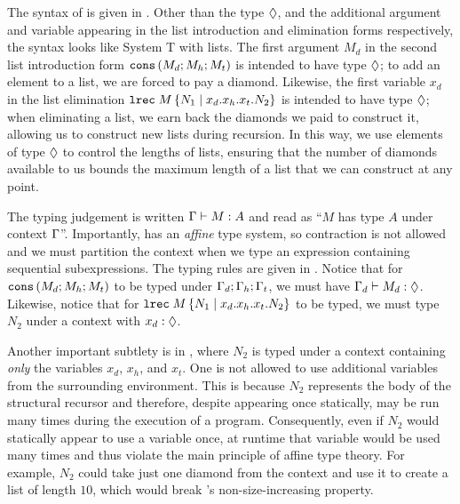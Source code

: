 

The syntax of \lfpl is given in . Other than the type $\tpdiam$, and the additional argument and variable appearing in the list introduction and elimination forms respectively, the syntax looks like System T with lists. The first argument $M_d$ in the second list introduction form $\tmcons{M_d}{M_h}{M_t}$ is intended to have type $\tpdiam$; to add an element to a list, we are forced to pay a diamond. Likewise, the first variable $x_d$ in the list elimination $\tmrec{M}{N_1}{x_d}{x_h}{x_t}{N_2}$ is intended to have type $\tpdiam$; when eliminating a list, we earn back the diamonds we paid to construct it, allowing us to construct new lists during recursion. In this way, we use elements of type $\tpdiam$ to control the lengths of lists, ensuring that the number of diamonds available to us bounds the maximum length of a list that we can construct at any point.

\enlargethispage{-1\baselineskip}
The typing judgement is written $\Gamma \vdash M : A$ and read as ``$M$ has type $A$ under context $\Gamma$''. Importantly, \lfpl has an \textit{affine} type system, so contraction is not allowed and we must partition the context when we type an expression containing sequential subexpressions. The typing rules are given in . Notice that for $\tmcons{M_d}{M_h}{M_t}$ to be typed under $\Gamma_d ; \Gamma_h ; \Gamma_t$, we must have $\types{\ctx_d}{M_d}{\tpdiam}$. Likewise, notice that for $\tmrec{M}{N_1}{x_d}{x_h}{x_t}{N_2}$ to be typed, we must type $N_2$ under a context with $x_d : \tpdiam$.

Another important subtlety is in , where $N_2$ is typed under a context containing \textit{only} the variables $x_d$, $x_h$, and $x_t$. One is not allowed to use additional variables from the surrounding environment. This is because $N_2$ represents the body of the structural recursor and therefore, despite appearing once statically, may be run many times during the execution of a program. Consequently, even if $N_2$ would statically appear to use a variable once, at runtime that variable would be used many times and thus violate the main principle of affine type theory. For example, $N_2$ could take just one diamond from the context and use it to create a list of length $10$, which would break \lfpl's non-size-increasing property.





